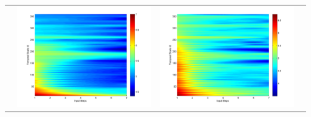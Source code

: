 \documentclass[11pt]{article}
\begin{document}
\begin{table}[H]
{\begin{tabular}{cccc}
&\begin{minipage}{.3\textwidth}\includegraphics[width=\linewidth]{resultgraph/AU/11532500p_rela.png}\end{minipage}
&\begin{minipage}{.3\textwidth}\includegraphics[width=\linewidth]{resultgraph/AU/11532500pep_rela.png}\end{minipage}

\end{tabular}}
\end{table}
\end{document}

